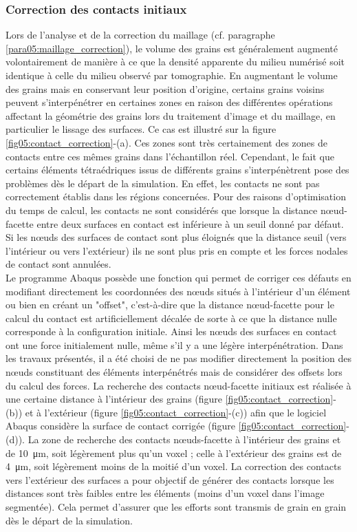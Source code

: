 		\subsubsection{Correction des contacts initiaux}
			Lors de l'analyse et de la correction du maillage (cf. paragraphe \ref{para05:maillage_correction}), le volume des grains est généralement augmenté volontairement de manière à ce que la densité apparente du milieu numérisé soit identique à celle du milieu observé par tomographie. En augmentant le volume des grains mais en conservant leur position d'origine, certains grains voisins peuvent s'interpénétrer en certaines zones en raison des différentes opérations affectant la géométrie des grains lors du traitement d'image et du maillage, en particulier le lissage des surfaces. Ce cas est illustré sur la figure \ref{fig05:contact_correction}-(a). Ces zones sont très certainement des zones de contacts entre ces mêmes grains dans l'échantillon réel. Cependant, le fait que certains éléments tétraédriques issus de différents grains s'interpénètrent pose des problèmes dès le départ de la simulation. En effet, les contacts ne sont pas correctement établis dans les régions concernées. Pour des raisons d'optimisation du temps de calcul, les contacts ne sont considérés que lorsque la distance n\oe{}ud-facette entre deux surfaces en contact est inférieure à un seuil donné par défaut. Si les n\oe{}uds des surfaces de contact sont plus éloignés que la distance seuil (vers l'intérieur ou vers l'extérieur) ils ne sont plus pris en compte et les forces nodales de contact sont annulées.
			\\Le programme Abaqus possède une fonction qui permet de corriger ces défauts en modifiant directement les coordonnées des n\oe{}uds situés à l'intérieur d'un élément ou bien en créant un "offset", c'est-à-dire que la distance n\oe{}ud-facette pour le calcul du contact est artificiellement décalée de sorte à ce que la distance nulle corresponde à la configuration initiale. Ainsi les n\oe{}uds des surfaces en contact ont une force initialement nulle, même s'il y a une légère interpénétration. Dans les travaux présentés, il a été choisi de ne pas modifier directement la position des n\oe{}uds constituant des éléments interpénétrés mais de considérer des offsets lors du calcul des forces. La recherche des contacts n\oe{}ud-facette initiaux est réalisée à une certaine distance à l'intérieur des grains (figure \ref{fig05:contact_correction}-(b)) et à l'extérieur (figure \ref{fig05:contact_correction}-(c)) afin que le logiciel Abaqus considère la surface de contact corrigée (figure \ref{fig05:contact_correction}-(d)). La zone de recherche des contacts n\oe{}uds-facette à l'intérieur des grains et de \SI{10}{\micro\meter}, soit légèrement plus qu'un voxel ; celle à l'extérieur des grains est de \SI{4}{\micro\meter}, soit légèrement moins de la moitié d'un voxel. La correction des contacts vers l'extérieur des surfaces a pour objectif de générer des contacts lorsque les distances sont très faibles entre les éléments (moins d'un voxel dans l'image segmentée). Cela permet d'assurer que les efforts sont transmis de grain en grain dès le départ de la simulation.

